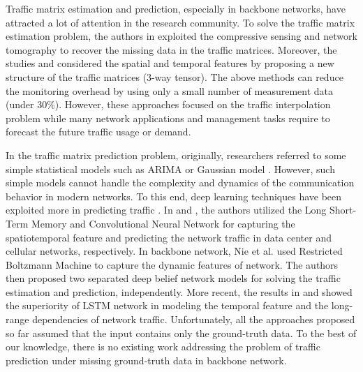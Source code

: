 Traffic matrix estimation and prediction, especially in backbone networks, have attracted a lot of attention in the research community. 
To solve the traffic matrix estimation problem, the authors in \cite{hu2015cracking} exploited the compressive sensing and network tomography to recover the missing data in the traffic matrices. Moreover, the studies \cite{xie2016accurate} and \cite{xie2017accurate} considered the spatial and temporal features by proposing a new structure of the traffic matrices (3-way tensor).
The above methods can reduce the monitoring overhead by using only a small number of measurement data (under 30$\%$). However, these approaches focused on the traffic interpolation problem while many network applications and management tasks require to forecast the future traffic usage or demand.

In the traffic matrix prediction problem, originally, researchers referred to some simple statistical models such as ARIMA or Gaussian model \cite{zhou2017accurate}. However, such simple models cannot handle the complexity and dynamics of the communication behavior in modern networks. 
To this end, deep learning techniques have been exploited more in predicting traffic \cite{wang2017spatiotemporal, cao2018interactive, nie2016traffic}. 
In \cite{wang2017spatiotemporal} and \cite{cao2018interactive}, the authors utilized the Long Short-Term Memory and Convolutional Neural Network for capturing the spatiotemporal feature and predicting the network traffic in data center and cellular networks, respectively. In backbone network, Nie et al. \cite{nie2016traffic} used Restricted Boltzmann Machine to capture the dynamic features of network. The authors then proposed two separated deep belief network models for solving the traffic estimation and prediction, independently. More recent, the results in \cite{azzouni2018neutm} and \cite{vinayakumar2017applying} showed the superiority of LSTM network in modeling the temporal feature and the long-range dependencies of network traffic. Unfortunately, all the approaches proposed so far assumed that the input contains only the ground-truth data. To the best of our knowledge, there is no existing work addressing the problem of traffic prediction under missing ground-truth data in backbone network.
